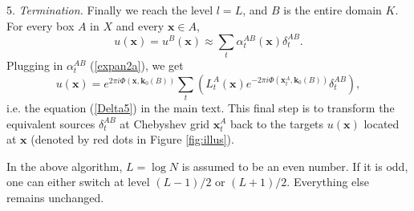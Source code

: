 5.  {\it Termination.} Finally we reach the level $l=L$, and $B$ is the entire domain $K$. For every box $A$ in $X$ and every $\mathbf{x}\in A$, 
\begin{equation}
u(\mathbf{x})=u^{B}(\mathbf{x})\approx \sum_t \alpha_t^{AB}(\mathbf{x})\delta_t^{AB}.
\end{equation}
Plugging in $\alpha_t^{AB}$ (\ref{expan2a}), we get
\begin{equation} \label{delta5}
u(\mathbf{x})=e^{2\pi i
  \Phi(\mathbf{x},\mathbf{k}_0(B))}\sum_t \left( L_t^A(\mathbf{x}) e^{-2\pi i
  \Phi(\mathbf{x}_t^A,\mathbf{k}_0(B))}
  \delta_t^{AB}\right),
\end{equation}
i.e. the equation (\ref{Delta5}) in the main text. This final step is to transform the equivalent sources $\delta_t^{AB}$ at Chebyshev grid $\mathbf{x}_t^A$ back to the targets $u(\mathbf{x})$ located at $\mathbf{x}$ (denoted by red dots in Figure \ref{fig:illus}).

In the above algorithm, $L=\log N$ is assumed to be an even number. If it is odd, one can either switch at level $(L-1)/2$ or $(L+1)/2$. Everything else remains unchanged.




\onecolumn



